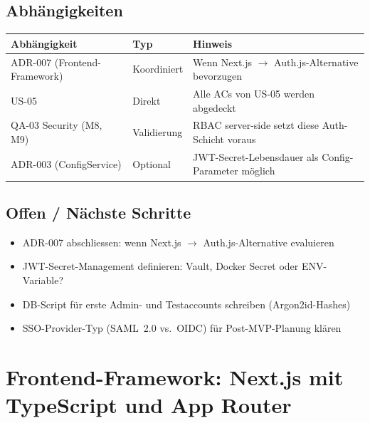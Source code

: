 \documentclass[a4paper, 11pt, oneside]{report}
\newcommand{\ra}{$\rightarrow$\xspace}
\newcommand{\todo}{$\square$\;}
\begin{document}
\section{Abhängigkeiten}

\begin{table}[htb]
\small\centering
\begin{tabularx}{\linewidth}{L{4cm} L{3cm} X}
\toprule
{}
\textbf{Abhängigkeit} & \textbf{Typ} & \textbf{Hinweis} \\
\midrule
ADR-007 (Frontend-Framework)  & Koordiniert   & Wenn Next.js \ra Auth.js-Alternative bevorzugen \\
US-05                         & Direkt        & Alle ACs von US-05 werden abgedeckt \\
QA-03 Security (M8, M9)       & Validierung   & RBAC server-side setzt diese Auth-Schicht voraus \\
ADR-003 (ConfigService)       & Optional      & JWT-Secret-Lebensdauer als Config-Parameter möglich \\
\bottomrule
\end{tabularx}
\end{table}

\section{Offen / Nächste Schritte}

\begin{itemize}[label=\todo]
  \item ADR-007 abschliessen: wenn Next.js \ra Auth.js-Alternative evaluieren
  \item JWT-Secret-Management definieren: Vault, Docker Secret oder ENV-Variable?
  \item DB-Script für erste Admin- und Testaccounts schreiben (Argon2id-Hashes)
  \item SSO-Provider-Typ (SAML~2.0 vs.\ OIDC) für Post-MVP-Planung klären
\end{itemize}

\chapter{Frontend-Framework: Next.js mit TypeScript und App Router}
\label{chap:adr007}
\end{document}
